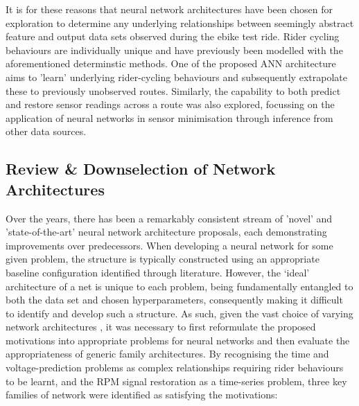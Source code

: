 \documentclass[a4paper, 10pt]{article}
\numberwithin{equation}{section}
\begin{document}
It is for these reasons that neural network architectures have been chosen for exploration to determine any underlying relationships between seemingly abstract feature and output data sets observed during the ebike test ride. Rider cycling behaviours are individually unique and have previously been modelled with the aforementioned determinstic methods. One of the proposed ANN architecture aims to 'learn' underlying rider-cycling behaviours and subsequently extrapolate these to previously unobserved routes. Similarly, the capability to both predict and restore sensor readings across a route was also explored, focussing on the application of neural networks in sensor minimisation through inference from other data sources.

\subsection{Review \& Downselection of Network Architectures}
\label{sec:nn_types}
Over the years, there has been a remarkably consistent stream of 'novel' and 'state-of-the-art' neural network architecture proposals, each demonstrating improvements over predecessors. When developing a neural network for some given problem, the structure is typically constructed using an appropriate baseline configuration identified through literature. However, the ‘ideal’ architecture of a net is unique to each problem, being fundamentally entangled to both the data set and chosen hyperparameters, consequently making it difficult to identify and develop such a structure. As such, given the vast choice of varying network architectures \cite{nn:nn_types}, it was necessary to first reformulate the proposed motivations into appropriate problems for neural networks and then evaluate the appropriateness of generic family architectures. By recognising the time and voltage-prediction problems as complex relationships requiring rider behaviours to be learnt, and the RPM signal restoration as a time-series problem, three key families of network were identified as satisfying the motivations:
\end{document}

